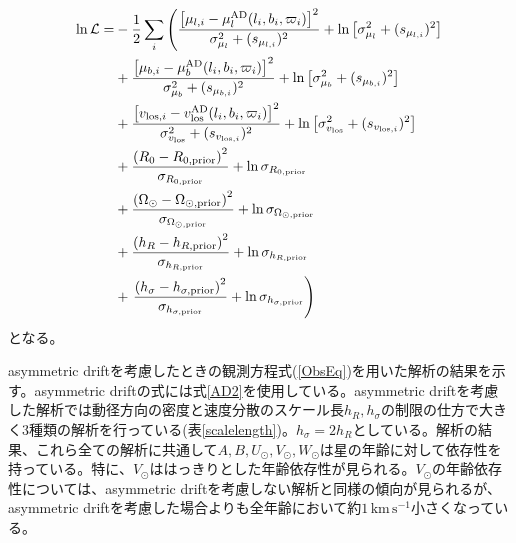 \begin{align}
\begin{aligned}
	\ln \mathcal{L} =& -\frac{1}{2}\sum_i \left(\frac{\left[\mu_{l,i} - \mu_l^{\mathrm{AD}}(l_i,b_i,\varpi_i)\right]^2}{\sigma_{\mu_l}^2 + (s_{\mu_{l,i}})^2}  + {\rm ln}\left[\sigma_{\mu_l}^2 + (s_{\mu_{l,i}})^2\right] \right. \\
	&+ \frac{\left[\mu_{b,i} - \mu_b^{\mathrm{AD}}(l_i,b_i,\varpi_i)\right]^2}{\sigma_{\mu_b}^2 + (s_{\mu_{b,i}})^2}  + {\rm ln}\left[\sigma_{\mu_b}^2 + (s_{\mu_{b,i}})^2\right] \\
	&+ \frac{\left[v_{\mathrm{los},i} - v^{\mathrm{AD}}_{\mathrm{los}}(l_i,b_i,\varpi_i)\right]^2}{\sigma_{v_{\mathrm{los}}}^2 + (s_{v_{\mathrm{los},i}})^2} + {\rm ln}\left[\sigma_{v_{\mathrm{los}}}^2 + (s_{v_{\mathrm{los},i}})^2\right]\\
	&+ \frac{\left(R_0 - R_{0,\mathrm{prior}}\right)^2}{\sigma_{R_{0,\mathrm{prior}}}} + \ln{\sigma_{R_{0,\mathrm{prior}}}}\\
	&+ \frac{\left(\Omega_{\odot} - \Omega_{\odot,\mathrm{prior}}\right)^2}{\sigma_{\Omega_{\odot,\mathrm{prior}}}} + \ln{\sigma_{\Omega_{\odot,\mathrm{prior}}}}\\
	&+ \frac{\left(h_R - h_{R,\mathrm{prior}}\right)^2}{\sigma_{h_{R,\mathrm{prior}}}} + \ln{\sigma_{h_{R,\mathrm{prior}}}}\\
	&+ \left. \frac{\left(h_{\sigma} - h_{\sigma,\mathrm{prior}}\right)^2}{\sigma_{h_{\sigma,\mathrm{prior}}}} + \ln{\sigma_{h_{\sigma,\mathrm{prior}}}} \right)
\end{aligned}
\end{align}
となる。


asymmetric driftを考慮したときの観測方程式(\ref{ObsEq})を用いた解析の結果を示す。asymmetric driftの式には式\ref{AD2}を使用している。asymmetric driftを考慮した解析では動径方向の密度と速度分散のスケール長$h_R,h_{\sigma}$の制限の仕方で大きく3種類の解析を行っている(表\ref{scalelength})。$h_{\sigma}=2h_R$としている。解析の結果、これら全ての解析に共通して$A,B,U_{\odot},V_{\odot},W_{\odot}$は星の年齢に対して依存性を持っている。特に、$V_{\odot}$ははっきりとした年齢依存性が見られる。$V_{\odot}$の年齢依存性については、asymmetric driftを考慮しない解析と同様の傾向が見られるが、asymmetric driftを考慮した場合よりも全年齢において約$1\,\mathrm{km\,s^{-1}}$小さくなっている。

